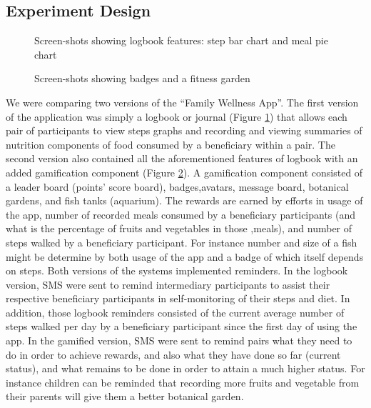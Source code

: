 \documentclass{sig-alternate}
\begin{document}
\subsection{Experiment Design}
\begin{figure}
\centering
{}
\caption{Screen-shots showing logbook features: step bar chart and meal pie chart}
\label{figure:logbookapp}
\end{figure}
\begin{figure}
\centering
{}
\caption{Screen-shots showing badges and a fitness garden}
\label{figure:gameapp}
\end{figure}
We were comparing two versions of the ``Family Wellness App''. The first version of the application was simply a logbook or journal (Figure \ref{figure:logbookapp}) that allows each pair of participants to view steps graphs and recording and viewing summaries of nutrition components of food consumed by a beneficiary within a pair. The second version also contained all the aforementioned features of logbook with an added gamification component (Figure \ref{figure:gameapp}). A gamification component consisted of a leader board (points' score board), badges,avatars, message board, botanical gardens, and fish tanks (aquarium). The rewards are earned by efforts in usage of the app, number of recorded meals consumed by a beneficiary participants (and what is the percentage of fruits and vegetables in those ,meals), and number of steps walked by a beneficiary participant. For instance  number and size of a fish might be determine by both usage of the app and a badge of which itself depends on steps.\newline
Both versions of the systems implemented reminders. In the logbook version, SMS were sent to remind intermediary participants to assist their respective beneficiary participants in self-monitoring of their steps and diet. In addition, those logbook reminders consisted of the current average number of steps walked per day by a beneficiary participant since the first day of using the app. In the gamified version, SMS were sent to remind pairs what they need to do in order to achieve rewards, and also what they have done so far (current status), and what remains to be done in order to attain a much higher status. For instance children can be reminded that recording more fruits and vegetable from their parents will give them a better botanical garden.\newline    
\end{document}
